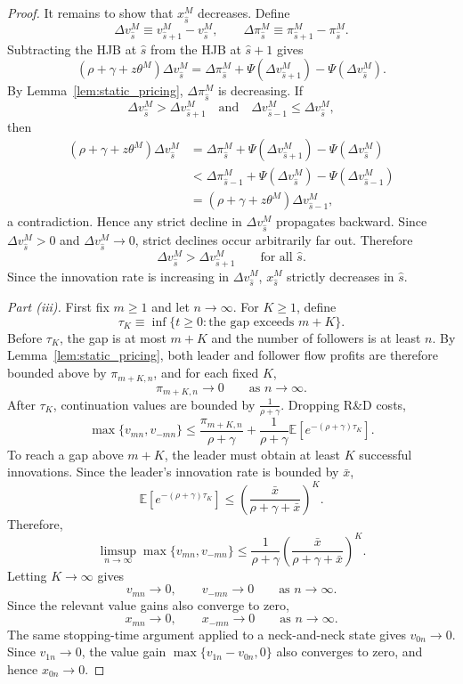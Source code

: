 \documentclass[12pt]{article}
\begin{document}
\begin{proof}
It remains to show that \(x^M_{\hat{s}}\) decreases. Define
\[\Delta v^M_{\hat{s}}\equiv v^M_{\hat{s}+1}-v^M_{\hat{s}},
\qquad\Delta\pi^M_{\hat{s}}\equiv \pi^M_{\hat{s}+1}-\pi^M_{\hat{s}}.\]
Subtracting the HJB at \(\hat{s}\) from the HJB at \(\hat{s}+1\) gives
\[(\rho+\gamma+z\theta^M)\Delta v^M_{\hat{s}}=
\Delta\pi^M_{\hat{s}}+\Psi(\Delta v^M_{\hat{s}+1})-\Psi(\Delta v^M_{\hat{s}}).\]
By Lemma~\ref{lem:static_pricing}, \(\Delta\pi^M_{\hat{s}}\) is decreasing. If
\[\Delta v^M_{\hat{s}}>\Delta v^M_{\hat{s}+1}
\quad\text{and}\quad\Delta v^M_{\hat{s}-1}\leq \Delta v^M_{\hat{s}},\]
then
\[\begin{aligned}
(\rho+\gamma+z\theta^M)\Delta v^M_{\hat{s}}&=\Delta\pi^M_{\hat{s}}+\Psi(\Delta v^M_{\hat{s}+1})-\Psi(\Delta v^M_{\hat{s}}) \\
&<\Delta\pi^M_{\hat{s}-1}+\Psi(\Delta v^M_{\hat{s}})-\Psi(\Delta v^M_{\hat{s}-1}) \\
&=(\rho+\gamma+z\theta^M)\Delta v^M_{\hat{s}-1},
\end{aligned}
\]
a contradiction. Hence any strict decline in \(\Delta v^M_{\hat{s}}\) propagates backward. Since \(\Delta v^M_{\hat{s}}>0\) and \(\Delta v^M_{\hat{s}}\to 0\), strict declines occur arbitrarily far out. Therefore
\[\Delta v^M_{\hat{s}}>\Delta v^M_{\hat{s}+1}\qquad\text{for all }\hat{s}.\]
Since the innovation rate is increasing in \(\Delta v^M_{\hat{s}}\), \(x^M_{\hat{s}}\) strictly decreases in \(\hat{s}\).

\medskip

\noindent\textit{Part (iii).}
First fix \(m\geq1\) and let \(n\to\infty\). For \(K\geq 1\), define
\[\tau_K\equiv \inf\{t\geq 0:\text{the gap exceeds }m+K\}.\]
Before \(\tau_K\), the gap is at most \(m+K\) and the number of followers is at least \(n\). By Lemma~\ref{lem:static_pricing}, both leader and follower flow profits are therefore bounded above by \(\pi_{m+K,n}\), and for each fixed \(K\),
\[\pi_{m+K,n}\to 0\qquad\text{as } n\to\infty.\]
After \(\tau_K\), continuation values are bounded by \(\frac{1}{\rho+\gamma}\). Dropping R\&D costs,
\[\max\{v_{mn},v_{-mn}\}\leq\frac{\pi_{m+K,n}}{\rho+\gamma}+\frac{1}{\rho+\gamma}\mathbb E\!\left[e^{-(\rho+\gamma)\tau_K}\right].\]
To reach a gap above \(m+K\), the leader must obtain at least \(K\) successful innovations. Since the leader's innovation rate is bounded by \(\bar x\),
\[\mathbb E\!\left[e^{-(\rho+\gamma)\tau_K}\right]
\leq\left(\frac{\bar x}{\rho+\gamma+\bar x}\right)^K.\]
Therefore,
\[\limsup_{n\to\infty}\max\{v_{mn},v_{-mn}\}
\leq\frac{1}{\rho+\gamma}\left(\frac{\bar x}{\rho+\gamma+\bar x}\right)^K.\]
Letting \(K\to\infty\) gives
\[v_{mn}\to 0,\qquad v_{-mn}\to 0\qquad\text{as }n\to\infty.\]
Since the relevant value gains also converge to zero,
\[x_{mn}\to 0,\qquad x_{-mn}\to 0\qquad\text{as }n\to\infty.\]
The same stopping-time argument applied to a neck-and-neck state gives \(v_{0n}\to0\). Since \(v_{1n}\to0\), the value gain \(\max\{v_{1n}-v_{0n},0\}\) also converges to zero, and hence \(x_{0n}\to0\).


\end{proof}
\end{document}

